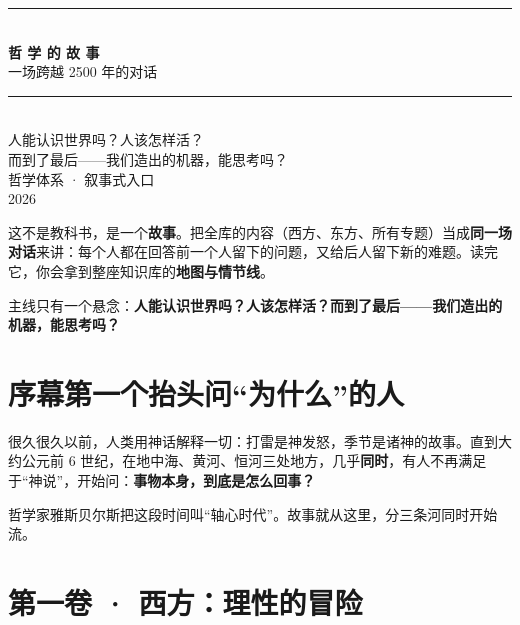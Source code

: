 \documentclass[12pt,a4paper,fontset=none]{ctexart}
\begin{document}
\thispagestyle{empty}
\begin{center}
\vspace*{3.2cm}
{\color{rule}\rule{0.5\textwidth}{0.8pt}}\\[1.1cm]
{\Huge\hei\bfseries\color{ink} 哲 学 的 故 事}\\[0.7cm]
{\LARGE\notolight\color{accent} 一场跨越 2500 年的对话}\\[1.1cm]
{\color{rule}\rule{0.5\textwidth}{0.8pt}}\\[2.2cm]
{\large\notolight\color{ink!80} 人能认识世界吗？人该怎样活？\\[0.4em]
而到了最后——我们造出的机器，能思考吗？}\\[3.5cm]
{\normalsize\sffamily\color{notebar} 哲学体系 · 叙事式入口}\\[0.3em]
{\small\sffamily\color{notebar} 2026}
\end{center}
\clearpage

\thispagestyle{fancy}
\begin{note}
这不是教科书，是一个\textbf{故事}。把全库的内容（西方、东方、所有专题）当成\textbf{同一场对话}来讲：每个人都在回答前一个人留下的问题，又给后人留下新的难题。读完它，你会拿到整座知识库的\textbf{地图与情节线}。
\end{note}

\begin{mainline}
主线只有一个悬念：\textbf{人能认识世界吗？人该怎样活？而到了最后——我们造出的机器，能思考吗？}
\end{mainline}

\section*{序幕\quad 第一个抬头问“为什么”的人}

很久很久以前，人类用神话解释一切：打雷是神发怒，季节是诸神的故事。直到大约公元前 6 世纪，在地中海、黄河、恒河三处地方，几乎\textbf{同时}，有人不再满足于“神说”，开始问：\textbf{事物本身，到底是怎么回事？}

哲学家雅斯贝尔斯把这段时间叫“轴心时代”。故事就从这里，分三条河同时开始流。

\section{第一卷 · 西方：理性的冒险}
\end{document}
